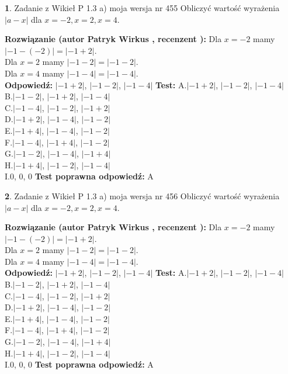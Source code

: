 \documentclass[12pt, a4paper]{article}
\theoremstyle{definition} %
\newtheorem{zad}{}
\newcommand{\zadStart}[1]{\begin{zad}#1\newline}
\newcommand{\zadStop}{\end{zad}}
\newcommand{\rozwStart}[2]{\noindent \textbf{Rozwiązanie (autor #1 , recenzent #2): }\newline}
\newcommand{\rozwStop}{\newline}
\newcommand{\odpStart}{\noindent \textbf{Odpowiedź:}\newline}
\newcommand{\odpStop}{\newline}
\newcommand{\testStart}{\noindent \textbf{Test:}\newline}
\newcommand{\testStop}{\newline}
\newcommand{\kluczStart}{\noindent \textbf{Test poprawna odpowiedź:}\newline}
\newcommand{\kluczStop}{\newline}
\begin{document}
\zadStart{Zadanie z Wikieł P 1.3 a) moja wersja nr 455}
Obliczyć wartość wyrażenia $|a - x|$ dla $x=-2,x=2,x=4$.
\zadStop
\rozwStart{Patryk Wirkus}{}
Dla $x = -2$ mamy $|-1 - (-2)| = |-1 + 2|$.\\
Dla $x = 2$ mamy $|-1 - 2| = |-1 - 2|$.\\
Dla $x = 4$ mamy $|-1 - 4| = |-1 - 4|$.\\
\rozwStop
\odpStart
$|-1 + 2|$, $|-1 - 2|$, $|-1 - 4|$
\odpStop
\testStart
A.$|-1 + 2|$, $|-1 - 2|$, $|-1 - 4|$\\
B.$|-1 - 2|$, $|-1 + 2|$, $|-1 - 4|$\\
C.$|-1 - 4|$, $|-1 - 2|$, $|-1 + 2|$\\
D.$|-1 + 2|$, $|-1 - 4|$, $|-1 - 2|$\\
E.$|-1 + 4|$, $|-1 - 4|$, $|-1 - 2|$\\
F.$|-1 - 4|$, $|-1 + 4|$, $|-1 - 2|$\\
G.$|-1 - 2|$, $|-1 - 4|$, $|-1 + 4|$\\
H.$|-1 + 4|$, $|-1 - 2|$, $|-1 - 4|$\\
I.$0$, $0$, $0$
\testStop
\kluczStart
A
\kluczStop



\zadStart{Zadanie z Wikieł P 1.3 a) moja wersja nr 456}
Obliczyć wartość wyrażenia $|a - x|$ dla $x=-2,x=2,x=4$.
\zadStop
\rozwStart{Patryk Wirkus}{}
Dla $x = -2$ mamy $|-1 - (-2)| = |-1 + 2|$.\\
Dla $x = 2$ mamy $|-1 - 2| = |-1 - 2|$.\\
Dla $x = 4$ mamy $|-1 - 4| = |-1 - 4|$.\\
\rozwStop
\odpStart
$|-1 + 2|$, $|-1 - 2|$, $|-1 - 4|$
\odpStop
\testStart
A.$|-1 + 2|$, $|-1 - 2|$, $|-1 - 4|$\\
B.$|-1 - 2|$, $|-1 + 2|$, $|-1 - 4|$\\
C.$|-1 - 4|$, $|-1 - 2|$, $|-1 + 2|$\\
D.$|-1 + 2|$, $|-1 - 4|$, $|-1 - 2|$\\
E.$|-1 + 4|$, $|-1 - 4|$, $|-1 - 2|$\\
F.$|-1 - 4|$, $|-1 + 4|$, $|-1 - 2|$\\
G.$|-1 - 2|$, $|-1 - 4|$, $|-1 + 4|$\\
H.$|-1 + 4|$, $|-1 - 2|$, $|-1 - 4|$\\
I.$0$, $0$, $0$
\testStop
\kluczStart
A
\kluczStop
\end{document}
